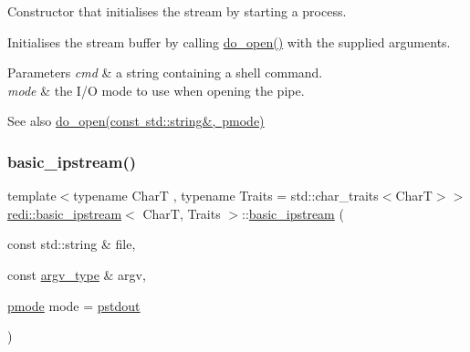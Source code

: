 Constructor that initialises the stream by starting a process. 

Initialises the stream buffer by calling \mbox{\hyperlink{classredi_1_1pstream__common_a2505ab3e3a834b92d98b5bcb97734dfe}{do\+\_\+open()}} with the supplied arguments.


\begin{DoxyParams}{Parameters}
{\em cmd} & a string containing a shell command. \\
\hline
{\em mode} & the I/O mode to use when opening the pipe. \\
\hline
\end{DoxyParams}
\begin{DoxySeeAlso}{See also}
\mbox{\hyperlink{classredi_1_1pstream__common_a2505ab3e3a834b92d98b5bcb97734dfe}{do\+\_\+open(const std\+::string\&, pmode)}} 
\end{DoxySeeAlso}
\mbox{\label{classredi_1_1basic__ipstream_a5aac4d83300cfca6dfcdf6632c900a4d}} 
\subsubsection{\texorpdfstring{basic\+\_\+ipstream()}{basic\_ipstream()}\hspace{0.1cm}{\footnotesize\ttfamily [2/3]}}
{\footnotesize\ttfamily template$<$typename CharT , typename Traits  = std\+::char\+\_\+traits$<$\+Char\+T$>$$>$ \\
\mbox{\hyperlink{classredi_1_1basic__ipstream}{redi\+::basic\+\_\+ipstream}}$<$ CharT, Traits $>$\+::\mbox{\hyperlink{classredi_1_1basic__ipstream}{basic\+\_\+ipstream}} (\begin{DoxyParamCaption}\item[{const std\+::string \&}]{file,  }\item[{const \mbox{\hyperlink{structredi_1_1pstreams_af902b894b095c1875e96c10129489467}{argv\+\_\+type}} \&}]{argv,  }\item[{\mbox{\hyperlink{structredi_1_1pstreams_a1eae4aad88812af03a0fbb3ec13c50b7}{pmode}}}]{mode = {\ttfamily \mbox{\hyperlink{structredi_1_1pstreams_ad3c6d53a98de4566478b1c40c101a42b}{pstdout}}} }\end{DoxyParamCaption})\hspace{0.3cm}{\ttfamily [inline]}}



